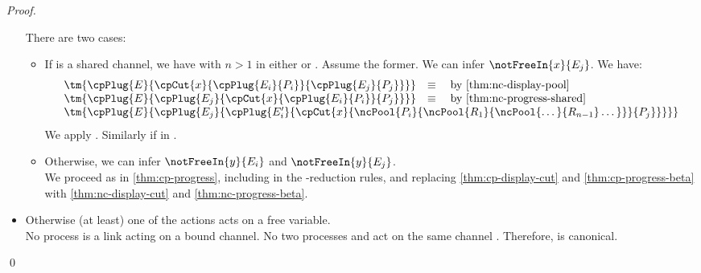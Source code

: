 \documentclass[UKenglish]{llncs}
\begin{document}
\begin{subappendices}
\begin{proof}
\begin{itemize}
      There are two cases:
      \begin{itemize}
      \item
        If  is a shared channel, we have  with $n >
        1$ in either  or . 
        Assume the former. 
        We can infer $\notFreeIn{x}{E_j}$.
        We have:
        \begin{gather*}
          \begin{array}{ll}
            \tm{\cpPlug{E}{\cpCut{x}{\cpPlug{E_i}{P_i}}{\cpPlug{E_j}{P_j}}}}
            & \equiv \quad \text{by \cref{thm:nc-display-pool}}
            \\
            \tm{\cpPlug{E}{\cpPlug{E_j}{\cpCut{x}{\cpPlug{E_i}{P_i}}{P_j}}}}
            & \equiv \quad \text{by \cref{thm:nc-progress-shared}}
            \\
            \multicolumn{2}{l}{
            \tm{\cpPlug{E}{\cpPlug{E_j}{\cpPlug{E_i^\prime}{\cpCut{x}{
            \ncPool{P_i}{\ncPool{R_1}{\ncPool{\dots}{R_{n-1}} \dots }}}{P_j}}}}}}
          \end{array}
        \end{gather*}
        We apply .
        Similarly if  in .
      \item
        Otherwise, we can infer $\notFreeIn{y}{E_i}$ and $\notFreeIn{y}{E_j}$.
        \\
        We proceed as in \cref{thm:cp-progress}, including  in
        the \textbeta-reduction rules, and replacing \cref{thm:cp-display-cut}
        and \cref{thm:cp-progress-beta} with \cref{thm:nc-display-cut} and
        \cref{thm:nc-progress-beta}.
      \end{itemize}
    \item 
      Otherwise (at least) one of the actions acts on a free variable.
      \\
      No process  is a link acting on a bound channel.
      No two processes  and  act on the same channel .
      Therefore,  is canonical.
    \end{itemize}
    \qed
  \end{proof}
\end{subappendices}
\end{document}
